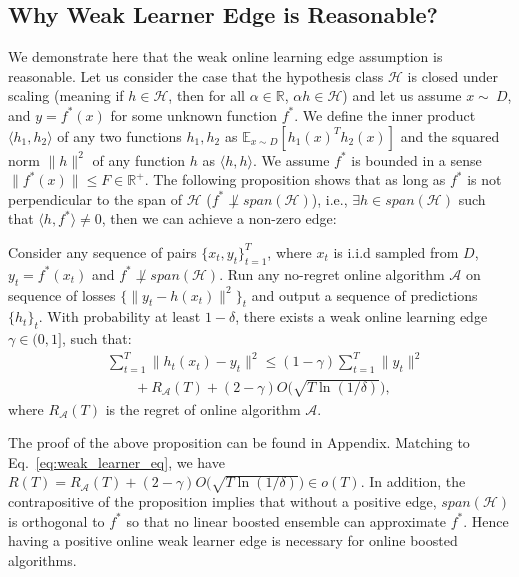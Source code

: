 \subsection{Why Weak Learner Edge is Reasonable?}
We demonstrate here that the weak online learning edge assumption is reasonable. 
Let us consider the case that the hypothesis class $\mathcal{H}$ is closed under scaling (meaning if $h \in \mathcal{H}$, then for all $\alpha \in \mathbb{R}$, $\alpha h \in \mathcal{H}$) and let us assume $x\sim\ D$, and $y = f^*(x)$ for some unknown function $f^*$. We define the inner product $\langle h_1, h_2\rangle$ of any two functions $h_1,h_2$ as $\mathbb{E}_{x\sim D} [h_1(x)^T h_2(x)]$ and the squared norm $\|h\|^2$ of any function $h$ as $\langle h, h \rangle$. We assume $f^*$ is bounded in a sense $\|f^*(x)\|\leq F\in\mathbb{R}^+$. The following proposition shows that as long as $f^*$ is not perpendicular to the span of $\mathcal{H}$ ($f^*\not\perp span(\mathcal{H})$), i.e., $\exists h\in span(\mathcal{H})$ such that $\langle h, f^* \rangle \neq 0$, then we can achieve a non-zero edge:
\begin{proposition}
\label{prop:edge_example}
Consider any sequence of pairs $\{x_t, y_t\}_{t=1}^T$, where $x_t$ is i.i.d sampled from $D$, $y_t = f^*(x_t)$ and $f^*\not\perp span(\mathcal{H})$. Run any no-regret online algorithm $\mathcal{A}$ on sequence of losses $\{\|y_t - h(x_t)\|^2\}_t$ and output a sequence of predictions $\{h_t\}_t$. With probability at least $1-\delta$, there exists a weak online learning edge $\gamma\in(0,1]$, such that:
\begin{align}
&\sum_{t=1}^T \|h_t(x_t) - y_t\|^2 \leq (1-\gamma)\sum_{t=1}^T \|y_t\|^2\nonumber\\
&\;\;\;\;\;\;\; +R_{\mathcal{A}}(T)+ (2-\gamma)O\Big(\sqrt{ T\ln(1/\delta)}\Big), \nonumber
\end{align} where $R_{\mathcal{A}}(T)$ is the regret of online algorithm $\mathcal{A}$.
\end{proposition}
The proof of the above proposition can be found in Appendix. Matching to Eq.~\ref{eq:weak_learner_eq}, we have $R(T) = R_{\mathcal{A}}(T) + (2-\gamma)O\Big(\sqrt{ T\ln(1/\delta)}\Big) \in o(T)$.
In addition, the contrapositive of the proposition implies that without a positive
edge, $span(\mathcal{H})$ is orthogonal to $f^*$ so that no linear boosted ensemble can approximate $f^*$. Hence having a positive online weak learner edge is necessary for online boosted algorithms.

